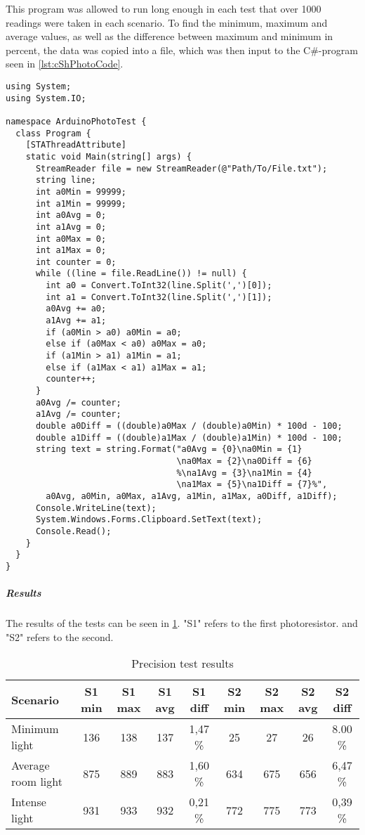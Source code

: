 This program was allowed to run long enough in each test that over 1000 readings were taken in each scenario.
To find the minimum, maximum and average values, as well as the difference between maximum and minimum in percent, the data was copied into a file, which was then input to the C\#-program seen in \cref{lst:cShPhotoCode}.

\lstset{language=[Sharp]C}
\begin{lstlisting}[label = lst:cShPhotoCode, caption = C\# data processing code]
using System;
using System.IO;

namespace ArduinoPhotoTest {
  class Program {
    [STAThreadAttribute]
    static void Main(string[] args) {
      StreamReader file = new StreamReader(@"Path/To/File.txt");
      string line;
      int a0Min = 99999;
      int a1Min = 99999;
      int a0Avg = 0;
      int a1Avg = 0;
      int a0Max = 0;
      int a1Max = 0;
      int counter = 0;
      while ((line = file.ReadLine()) != null) {
        int a0 = Convert.ToInt32(line.Split(',')[0]);
        int a1 = Convert.ToInt32(line.Split(',')[1]);
        a0Avg += a0;
        a1Avg += a1;
        if (a0Min > a0) a0Min = a0;
        else if (a0Max < a0) a0Max = a0;
        if (a1Min > a1) a1Min = a1;
        else if (a1Max < a1) a1Max = a1;
        counter++;
      }
      a0Avg /= counter;
      a1Avg /= counter;
      double a0Diff = ((double)a0Max / (double)a0Min) * 100d - 100;
      double a1Diff = ((double)a1Max / (double)a1Min) * 100d - 100;
      string text = string.Format("a0Avg = {0}\na0Min = {1}
                                  \na0Max = {2}\na0Diff = {6}
                                  %\na1Avg = {3}\na1Min = {4}
                                  \na1Max = {5}\na1Diff = {7}%",
        a0Avg, a0Min, a0Max, a1Avg, a1Min, a1Max, a0Diff, a1Diff);
      Console.WriteLine(text);
      System.Windows.Forms.Clipboard.SetText(text);
      Console.Read();
    }
  }
}
\end{lstlisting}
\subparagraph{Results}
The results of the tests can be seen in \cref{tab:precisionTestResults}. "S1" refers to the first photoresistor. and "S2" refers to the second.

  \begin{table}
    \centering
    \begin{tabular}[H!]{m{4.5em} c c c c c c c c}
      Scenario & S1 min & S1 max & S1 avg & S1 diff & S2 min & S2 max & S2 avg & S2 diff \\
      \hline
      Minimum light & 136 & 138 & 137 & 1,47 \% & 25 & 27 & 26 & 8.00 \% \\
      Average room light & 875 & 889 & 883 & 1,60 \%  & 634 & 675 & 656 & 6,47 \% \\
      Intense light & 931 & 933 & 932 & 0,21 \%  & 772 & 775 & 773 & 0,39 \% \\
    \end{tabular}
    \caption{Precision test results}\label{tab:precisionTestResults}
  \end{table}

